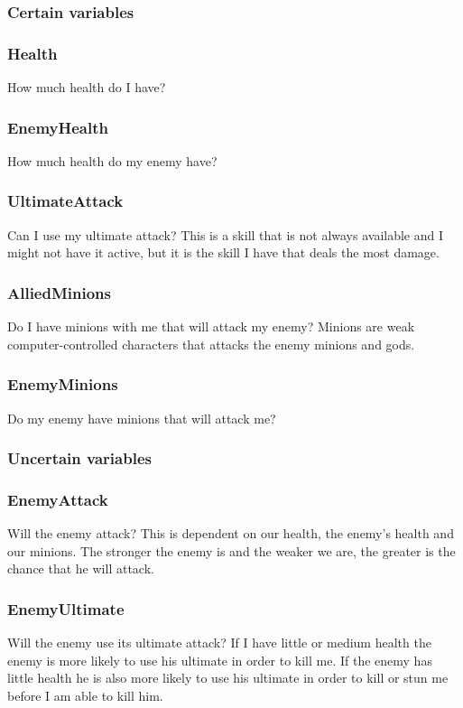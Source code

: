 \documentclass[titlepage]{article}
\begin{document}
\subsubsection{Certain variables}

\subsubsection*{Health}
How much health do I have?

\subsubsection*{EnemyHealth}
How much health do my enemy have?

\subsubsection*{UltimateAttack}
Can I use my ultimate attack? This is a skill that is not always available and I might not have it active, but it is the skill I have that deals the most damage.

\subsubsection*{AlliedMinions}
Do I have minions with me that will attack my enemy? Minions are weak computer-controlled characters that attacks the enemy minions and gods.

\subsubsection*{EnemyMinions}
Do my enemy have minions that will attack me?



\subsubsection{Uncertain variables}

\subsubsection*{EnemyAttack}
Will the enemy attack? This is dependent on our health, the enemy's health and our minions. The stronger the enemy is and the weaker we are, the greater is the chance that he will attack.

\subsubsection*{EnemyUltimate}
Will the enemy use its ultimate attack? If I have little or medium health the enemy is more likely to use his ultimate in order to kill me. If the enemy has little health he is also more likely to use his ultimate in order to kill or stun me before I am able to kill him.
\end{document}
